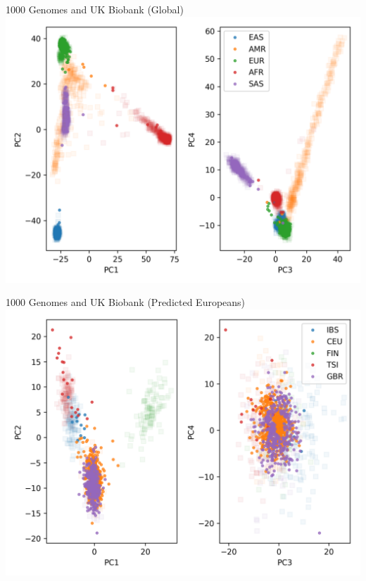 \documentclass{beamer}
\begin{document}
\begin{frame}{1000 Genomes and UK Biobank (Global)}
\includegraphics[height=0.9\textheight]{ukb_snps_kgn_1k.png}
\end{frame}

\begin{frame}{1000 Genomes and UK Biobank (Predicted Europeans)}
\includegraphics[height=0.9\textheight]{ukb_snps_kgn_1k_eur.png}
\end{frame}
\end{document}
